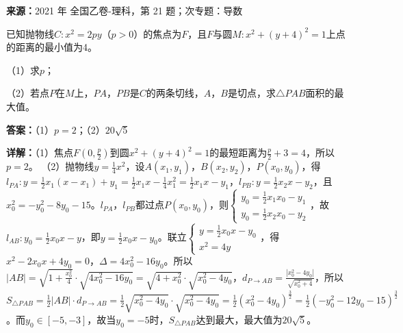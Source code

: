 \begin{question}[points=12]
\textbf{来源：}2021 年 全国乙卷-理科，第 21 题；次专题：导数\par
已知抛物线$C:x^2=2py$（$p>0$）的焦点为$F$，且$F$与圆$M:x^2+(y+4)^2=1$上点的距离的最小值为4。

（1）求$p$；

（2）若点$P$在$M$上，$PA$，$PB$是$C$的两条切线，$A$，$B$是切点，求$\triangle PAB$面积的最大值。
\begin{solution}
\textbf{答案：}（1）$p=2$；（2）$20\sqrt{5}$

\textbf{详解：}（1）焦点$F(0,\frac{p}{2})$到圆$x^2+(y+4)^2=1$的最短距离为$\frac{p}{2}+3=4$，所以$p=2$。
（2）抛物线$y=\frac14x^2$，设$A(x_1,y_1)$，$B(x_2,y_2)$，$P(x_0,y_0)$，得$l_{PA}: y=\frac12x_1(x-x_1)+y_1=\frac12x_1x-\frac14x_1^2=\frac12x_1x-y_1$，$l_{PB}: y=\frac12x_2x-y_2$，且$x_0^2=-y_0^2-8y_0-15$。$l_{PA}$，$l_{PB}$都过点$P(x_0,y_0)$，则$\begin{cases} y_0=\frac12x_1x_0-y_1 \\ y_0=\frac12x_2x_0-y_2 \end{cases}$，故$l_{AB}: y_0=\frac12x_0x-y$，即$y=\frac12x_0x-y_0$。联立$\begin{cases} y=\frac12x_0x-y_0 \\ x^2=4y \end{cases}$，得$x^2-2x_0x+4y_0=0$，$\Delta=4x_0^2-16y_0$。所以$|AB|=\sqrt{1+\frac{x_0^2}{4}}\cdot\sqrt{4x_0^2-16y_0}=\sqrt{4+x_0^2}\cdot\sqrt{x_0^2-4y_0}$，$d_{P\to AB}=\frac{|x_0^2-4y_0|}{\sqrt{x_0^2+4}}$，所以$S_{\triangle PAB}=\frac12|AB|\cdot d_{P\to AB}=\frac12\sqrt{x_0^2-4y_0}\cdot\sqrt{x_0^2-4y_0}=\frac12(x_0^2-4y_0)^{\frac32}=\frac12(-y_0^2-12y_0-15)^{\frac32}$。而$y_0\in[-5,-3]$，故当$y_0=-5$时，$S_{\triangle PAB}$达到最大，最大值为$20\sqrt{5}$。
\end{solution}
\end{question}

